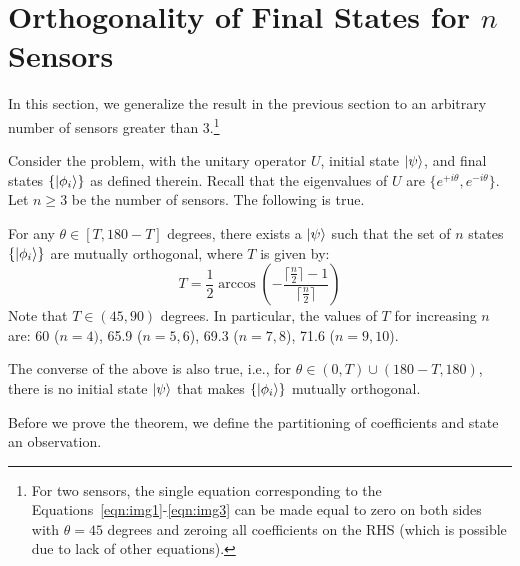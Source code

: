 \section{\bf Orthogonality of Final States for $n$ Sensors}
\label{sec:n-ortho}

In this section, we generalize the result in the previous section to an arbitrary number of sensors greater than 3.\footnote{For two sensors, the single equation corresponding to the Equations~\ref{eqn:img1}-\ref{eqn:img3} can be made equal to zero on both sides with $\theta=45$ degrees and zeroing all coefficients on the RHS (which is possible due to lack of other equations).}

\begin{theorem}
Consider the \iso problem, with the unitary operator $U$, initial state $\ket{\psi}$,
and final states $\{\ket{\phi_i}\}$ as defined therein. Recall that the eigenvalues of
$U$ are $\{e^{+i\theta}, e^{-i\theta}\}$. Let $n \geq 3$ be the number of sensors. The following is true.

For any $\theta \in [T, 180-T]$ degrees, there exists a $\ket{\psi}$ such that the set of $n$ states $\{\ket{\phi_i}\}$ are mutually orthogonal, where $T$ is given by:
$$T = \frac{1}{2}\arccos{\left(-\frac{\lceil \frac{n}{2} \rceil - 1}{\lceil \frac{n}{2} \rceil}\right)}$$
Note that $T \in (45, 90)$ degrees. In particular, the values of $T$ for increasing $n$ are:  60 ($n=4)$, 65.9 ($n=5,6$), 69.3 ($n=7,8$), 71.6 ($n=9,10$).

The converse of the above is also true, i.e., 
for $\theta \in (0, T) \cup (180-T, 180)$, there is
no initial state $\ket{\psi}$  that makes $\{\ket{\phi_i}\}$  mutually orthogonal. 
\label{thm:nsensors}
\end{theorem}
    

\medskip
Before we prove the theorem, we define the partitioning of coefficients and state an observation.

